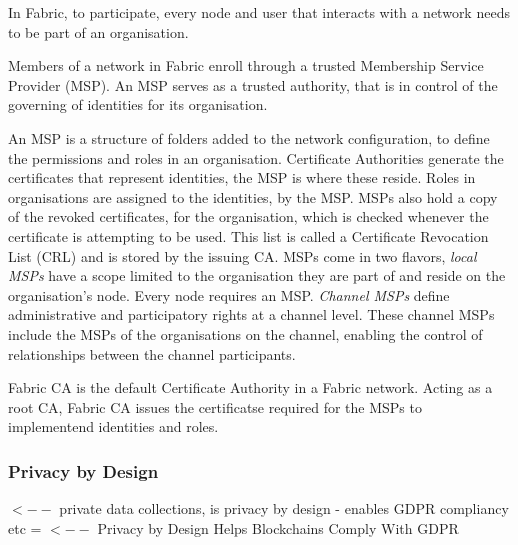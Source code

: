 In Fabric, to participate, every node and user that interacts with a network needs to be part of an organisation. \cite{noauthor_using_nodate}

Members of a network in Fabric enroll through a trusted Membership Service Provider (MSP). \cite{noauthor_introduction_nodate}
An MSP serves as a trusted authority, that is in control of the governing of identities for its organisation. 

An MSP is a structure of folders added to the network configuration, to define the permissions and roles in an organisation. 
Certificate Authorities generate the certificates that represent identities, the MSP is where these reside. 
Roles in organisations are assigned to the identities, by the MSP. 
MSPs also hold a copy of the revoked certificates, for the organisation, which is checked whenever the certificate is attempting to be used. \cite{noauthor_membership_nodate}
This list is called a Certificate Revocation List (CRL) \cite{cooper_internet_nodate} and is stored by the issuing CA. \cite{noauthor_identity_nodate}
MSPs come in two flavors, \emph{local MSPs} have a scope limited to the organisation they are part of and reside on the organisation's node. Every node requires an MSP.
\emph{Channel MSPs} define administrative and participatory rights at a channel level. These channel MSPs include the MSPs of the organisations on the channel, enabling the control of relationships between the channel participants. \cite{noauthor_membership_nodate}

Fabric CA is the default Certificate Authority in a Fabric network. Acting as a root CA, Fabric CA issues the certificatse required for the MSPs to implementend identities and roles. \cite{noauthor_identity_nodate}


\subsubsection{Privacy by Design}

\cite{noauthor_private_nodate} $<--$ private data collections, is privacy by design - enables GDPR compliancy etc = \cite{narumanchi_privacy_2019} $<--$ Privacy by Design Helps Blockchains Comply With GDPR

